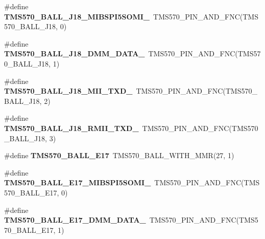 \begin{DoxyCompactItemize}
\item 
\mbox{\label{tms570lc4357-pins_8h_ac23f4f93cb13823fc0f1effea13c0ec9}} 
\#define {\bfseries T\+M\+S570\+\_\+\+B\+A\+L\+L\+\_\+\+J18\+\_\+\+M\+I\+B\+S\+P\+I5\+S\+O\+M\+I\+\_}~T\+M\+S570\+\_\+\+P\+I\+N\+\_\+\+A\+N\+D\+\_\+\+F\+NC(T\+M\+S570\+\_\+\+B\+A\+L\+L\+\_\+\+J18, 0)
\item 
\mbox{\label{tms570lc4357-pins_8h_a3f96e17a658b98a4e20580390d89da7e}} 
\#define {\bfseries T\+M\+S570\+\_\+\+B\+A\+L\+L\+\_\+\+J18\+\_\+\+D\+M\+M\+\_\+\+D\+A\+T\+A\+\_}~T\+M\+S570\+\_\+\+P\+I\+N\+\_\+\+A\+N\+D\+\_\+\+F\+NC(T\+M\+S570\+\_\+\+B\+A\+L\+L\+\_\+\+J18, 1)
\item 
\mbox{\label{tms570lc4357-pins_8h_a30ad5718a728faeedd6203593bb03627}} 
\#define {\bfseries T\+M\+S570\+\_\+\+B\+A\+L\+L\+\_\+\+J18\+\_\+\+M\+I\+I\+\_\+\+T\+X\+D\+\_}~T\+M\+S570\+\_\+\+P\+I\+N\+\_\+\+A\+N\+D\+\_\+\+F\+NC(T\+M\+S570\+\_\+\+B\+A\+L\+L\+\_\+\+J18, 2)
\item 
\mbox{\label{tms570lc4357-pins_8h_a20bd56f4b9cd52e1e5d6dc66ded7cb92}} 
\#define {\bfseries T\+M\+S570\+\_\+\+B\+A\+L\+L\+\_\+\+J18\+\_\+\+R\+M\+I\+I\+\_\+\+T\+X\+D\+\_}~T\+M\+S570\+\_\+\+P\+I\+N\+\_\+\+A\+N\+D\+\_\+\+F\+NC(T\+M\+S570\+\_\+\+B\+A\+L\+L\+\_\+\+J18, 3)
\item 
\mbox{\label{tms570lc4357-pins_8h_a30ad357c688c96a043e564f5d2932016}} 
\#define {\bfseries T\+M\+S570\+\_\+\+B\+A\+L\+L\+\_\+\+E17}~T\+M\+S570\+\_\+\+B\+A\+L\+L\+\_\+\+W\+I\+T\+H\+\_\+\+M\+MR(27, 1)
\item 
\mbox{\label{tms570lc4357-pins_8h_a88beeaf38df2d975fdce8310e1e0310a}} 
\#define {\bfseries T\+M\+S570\+\_\+\+B\+A\+L\+L\+\_\+\+E17\+\_\+\+M\+I\+B\+S\+P\+I5\+S\+O\+M\+I\+\_}~T\+M\+S570\+\_\+\+P\+I\+N\+\_\+\+A\+N\+D\+\_\+\+F\+NC(T\+M\+S570\+\_\+\+B\+A\+L\+L\+\_\+\+E17, 0)
\item 
\mbox{\label{tms570lc4357-pins_8h_a308676422069d31a54e289eb8e391e11}} 
\#define {\bfseries T\+M\+S570\+\_\+\+B\+A\+L\+L\+\_\+\+E17\+\_\+\+D\+M\+M\+\_\+\+D\+A\+T\+A\+\_}~T\+M\+S570\+\_\+\+P\+I\+N\+\_\+\+A\+N\+D\+\_\+\+F\+NC(T\+M\+S570\+\_\+\+B\+A\+L\+L\+\_\+\+E17, 1)

\end{DoxyCompactItemize}
